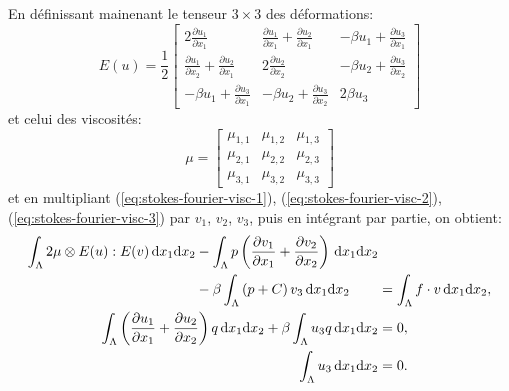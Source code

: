 En définissant mainenant le tenseur $3\times 3$ des déformations:
\begin{equation}\label{eq:stokes-fourier-strain-tensor-3d}
  E(u) = \frac{1}{2} \begin{bmatrix}
    2\displaystyle\frac{\partial u_1}{\partial x_1} %
    &  \displaystyle\frac{\partial u_1}{\partial x_1} + \displaystyle\frac{\partial u_2}{\partial x_1} %
    & - \beta u_1 + \displaystyle\frac{\partial u_3}{\partial x_1}\\
    \displaystyle\frac{\partial u_1}{\partial x_2}+ \displaystyle\frac{\partial u_2}{\partial x_1} %
    & 2 \displaystyle\frac{\partial u_2}{\partial x_2} %
    & -\beta u_2 + \displaystyle\frac{\partial u_3}{\partial x_2} \\
    - \beta u_1 + \displaystyle\frac{\partial u_3}{\partial x_1} %
    & - \beta u_2 + \displaystyle\frac{\partial u_3}{\partial x_2} & 2\beta u_3
  \end{bmatrix}
\end{equation}
et celui des viscosités:
\begin{equation}\label{eq:stokes-fourier-visc-tensor-3d}
\mu = \begin{bmatrix}
  \mu_{1,1} & \mu_{1,2} & \mu_{1,3} \\
  \mu_{2,1} & \mu_{2,2} & \mu_{2,3} \\
  \mu_{3,1} & \mu_{3,2} & \mu_{3,3}
\end{bmatrix}
\end{equation}
et en multipliant (\ref{eq:stokes-fourier-visc-1}),
(\ref{eq:stokes-fourier-visc-2}), (\ref{eq:stokes-fourier-visc-3}) par
$v_1$, $v_2$, $v_3$, puis en intégrant par partie, on obtient:
\begin{align}
  \begin{aligned}[b]
    \int_\Lambda 2\mu\otimes E(u):E(v)\,\mathrm dx_1\mathrm dx_2 %
    &- \int_\Lambda p\parent{\frac{\partial v_1}{\partial x_1}
                            + \frac{\partial v_2}{\partial x_2}}\,\mathrm dx_1\mathrm dx_2 \\
    &- \beta \int_\Lambda \parent{p + C}v_3\,\mathrm dx_1\mathrm dx_2
  \end{aligned}
  &= \int_\Lambda f\cdot v\,\mathrm dx_1\mathrm dx_2,\label{eq:stokes-fourier-visc-weak-1}\\
  \int_\Lambda \parent{\frac{\partial u_1}{\partial x_1} %
    + \frac{\partial u_2}{\partial x_2}}q\,\mathrm dx_1\mathrm dx_2 %
  + \beta \int_\Lambda u_3 q \,\mathrm dx_1\mathrm dx_2 %
  &= 0,\label{eq:stokes-fourier-visc-weak-2}\\
  \int_\Lambda u_3 \,\mathrm dx_1\mathrm dx_2 %
  &= 0.\label{eq:stokes-fourier-visc-weak-3}
\end{align}

